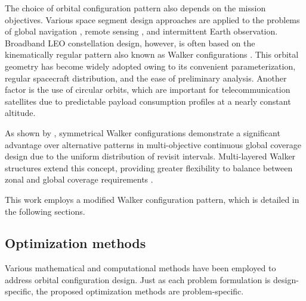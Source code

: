 The choice of orbital configuration pattern also depends on the mission objectives.
Various space segment design approaches are applied to the problems of global navigation \cite{guan2020,qin2025}, remote sensing \cite{wang2025dnsde}, and intermittent Earth observation. Broadband LEO constellation design, however, is often based on the kinematically regular pattern \cite{mozhaev1989} also known as Walker configurations \cite{walker1971}. This orbital geometry has become widely adopted owing to its convenient parameterization, regular spacecraft distribution, and the ease of preliminary analysis. Another factor is the use of circular orbits, which are important for telecommunication satellites due to predictable payload consumption profiles at a nearly constant altitude.

As shown by \cite{huang2021}, symmetrical Walker configurations demonstrate a significant advantage over alternative patterns in multi-objective continuous global coverage design due to the uniform distribution of revisit intervals. Multi-layered Walker structures extend this concept, providing greater flexibility to balance between zonal and global coverage requirements \cite{wang2026poaqpso,wang2025dnsde}.

This work employs a modified Walker configuration pattern, which is detailed in the following sections.

\subsection{Optimization methods}

Various mathematical and computational methods have been employed to address orbital configuration design. Just as each problem formulation is design-specific, the proposed optimization methods are problem-specific.

